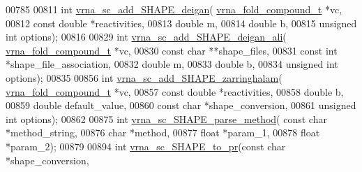 \begin{DoxyCode}
00785 
00811 \textcolor{keywordtype}{int} \hyperlink{group__soft__constraints_ga57d612b58e1c61dd6cfcb5a843f8f1b3}{vrna\_sc\_add\_SHAPE\_deigan}( \hyperlink{group__fold__compound_structvrna__fc__s}{vrna\_fold\_compound\_t} *vc,
00812                               \textcolor{keyword}{const} \textcolor{keywordtype}{double} *reactivities,
00813                               \textcolor{keywordtype}{double} m,
00814                               \textcolor{keywordtype}{double} b,
00815                               \textcolor{keywordtype}{unsigned} \textcolor{keywordtype}{int} options);
00816 
00829 \textcolor{keywordtype}{int} \hyperlink{group__soft__constraints_ga04ba85da63d8c793bb8001d1e6f800ba}{vrna\_sc\_add\_SHAPE\_deigan\_ali}( 
      \hyperlink{group__fold__compound_structvrna__fc__s}{vrna\_fold\_compound\_t} *vc,
00830                                   \textcolor{keyword}{const} \textcolor{keywordtype}{char} **shape\_files,
00831                                   \textcolor{keyword}{const} \textcolor{keywordtype}{int} *shape\_file\_association,
00832                                   \textcolor{keywordtype}{double} m,
00833                                   \textcolor{keywordtype}{double} b,
00834                                   \textcolor{keywordtype}{unsigned} \textcolor{keywordtype}{int} options);
00835 
00856 \textcolor{keywordtype}{int} \hyperlink{group__soft__constraints_gaf3c65a045060aef5c4e41693d30af58c}{vrna\_sc\_add\_SHAPE\_zarringhalam}( 
      \hyperlink{group__fold__compound_structvrna__fc__s}{vrna\_fold\_compound\_t} *vc,
00857                                     \textcolor{keyword}{const} \textcolor{keywordtype}{double} *reactivities,
00858                                     \textcolor{keywordtype}{double} b,
00859                                     \textcolor{keywordtype}{double} default\_value,
00860                                     \textcolor{keyword}{const} \textcolor{keywordtype}{char} *shape\_conversion,
00861                                     \textcolor{keywordtype}{unsigned} \textcolor{keywordtype}{int} options);
00862 
00875 \textcolor{keywordtype}{int} \hyperlink{constraints_8h_a71b84eb0dd69e5c256f4ecf8f78cf314}{vrna\_sc\_SHAPE\_parse\_method}( \textcolor{keyword}{const} \textcolor{keywordtype}{char} *method\_string,
00876                                 \textcolor{keywordtype}{char} *method,
00877                                 \textcolor{keywordtype}{float} *param\_1,
00878                                 \textcolor{keywordtype}{float} *param\_2);
00879 
00894 \textcolor{keywordtype}{int} \hyperlink{group__soft__constraints_ga67675b3ed48744489a3bcfa4174197cb}{vrna\_sc\_SHAPE\_to\_pr}(\textcolor{keyword}{const} \textcolor{keywordtype}{char} *shape\_conversion,

\end{DoxyCode}
